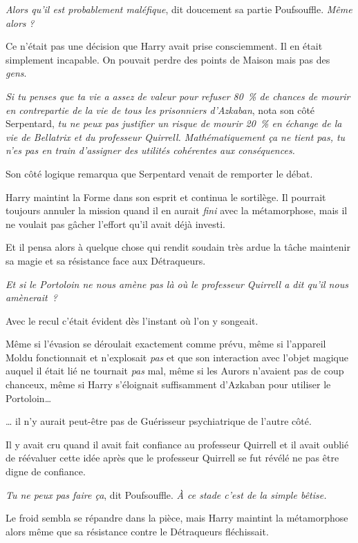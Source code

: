 \emph{Alors qu'il est probablement maléfique}, dit doucement sa partie Poufsouffle. \emph{Même alors} \emph{?}

Ce n'était pas une décision que Harry avait prise consciemment. Il en était simplement incapable. On pouvait perdre des points de Maison mais pas des \emph{gens}.

\emph{Si tu penses que ta vie a assez de valeur pour refuser 80~\% de chances de mourir en contrepartie de la vie de tous les prisonniers d'Azkaban}, nota son côté Serpentard, \emph{tu ne peux pas justifier un risque de mourir 20~\% en échange de la vie de Bellatrix et du professeur Quirrell. Mathématiquement ça ne tient pas, tu n'es pas en train d'assigner des utilités cohérentes aux conséquences.}

Son côté logique remarqua que Serpentard venait de remporter le débat.

Harry maintint la Forme dans son esprit et continua le sortilège. Il pourrait toujours annuler la mission quand il en aurait \emph{fini} avec la métamorphose, mais il ne voulait pas gâcher l'effort qu'il avait déjà investi.

Et il pensa alors à quelque chose qui rendit soudain très ardue la tâche maintenir sa magie et sa résistance face aux Détraqueurs.

\emph{Et si le Portoloin ne nous amène pas là où le professeur Quirrell a dit qu'il nous amènerait~?}

Avec le recul c'était évident dès l'instant où l'on y songeait.

Même si l'évasion se déroulait exactement comme prévu, même si l'appareil Moldu fonctionnait et n'explosait \emph{pas} et que son interaction avec l'objet magique auquel il était lié ne tournait \emph{pas} mal, même si les Aurors n'avaient pas de coup chanceux, même si Harry s'éloignait suffisamment d'Azkaban pour utiliser le Portoloin…

… il n'y aurait peut-être pas de Guérisseur psychiatrique de l'autre côté.

Il y avait cru quand il avait fait confiance au professeur Quirrell et il avait oublié de réévaluer cette idée après que le professeur Quirrell se fut révélé ne pas être digne de confiance.

\emph{Tu ne peux pas faire ça}, dit Poufsouffle. \emph{À ce stade c'est de la simple bêtise.}

Le froid sembla se répandre dans la pièce, mais Harry maintint la métamorphose alors même que sa résistance contre le Détraqueurs fléchissait.

